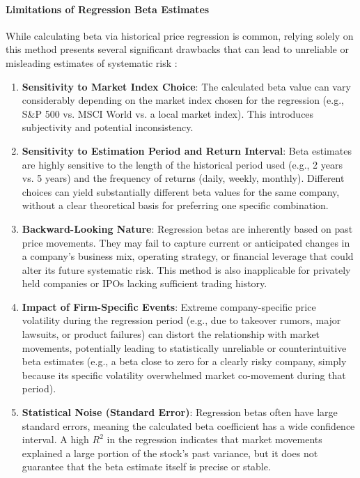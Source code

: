 \paragraph{Limitations of Regression Beta Estimates} \label{par:regression_beta_limitations}
While calculating beta via historical price regression is common, relying solely on this method presents several significant drawbacks that can lead to unreliable or misleading estimates of systematic risk \parencite{damodaran_risk_parameters}:
\begin{enumerate}
    \item \textbf{Sensitivity to Market Index Choice}: The calculated beta value can vary considerably depending on the market index chosen for the regression (e.g., S\&P 500 vs. MSCI World vs. a local market index). This introduces subjectivity and potential inconsistency.
    \item \textbf{Sensitivity to Estimation Period and Return Interval}: Beta estimates are highly sensitive to the length of the historical period used (e.g., 2 years vs. 5 years) and the frequency of returns (daily, weekly, monthly). Different choices can yield substantially different beta values for the same company, without a clear theoretical basis for preferring one specific combination.
    \item \textbf{Backward-Looking Nature}: Regression betas are inherently based on past price movements. They may fail to capture current or anticipated changes in a company's business mix, operating strategy, or financial leverage that could alter its future systematic risk. This method is also inapplicable for privately held companies or IPOs lacking sufficient trading history.
    \item \textbf{Impact of Firm-Specific Events}: Extreme company-specific price volatility during the regression period (e.g., due to takeover rumors, major lawsuits, or product failures) can distort the relationship with market movements, potentially leading to statistically unreliable or counterintuitive beta estimates (e.g., a beta close to zero for a clearly risky company, simply because its specific volatility overwhelmed market co-movement during that period).
    \item \textbf{Statistical Noise (Standard Error)}: Regression betas often have large standard errors, meaning the calculated beta coefficient has a wide confidence interval. A high \(R^2\) in the regression indicates that market movements explained a large portion of the stock's past variance, but it does not guarantee that the beta estimate itself is precise or stable.
\end{enumerate}

